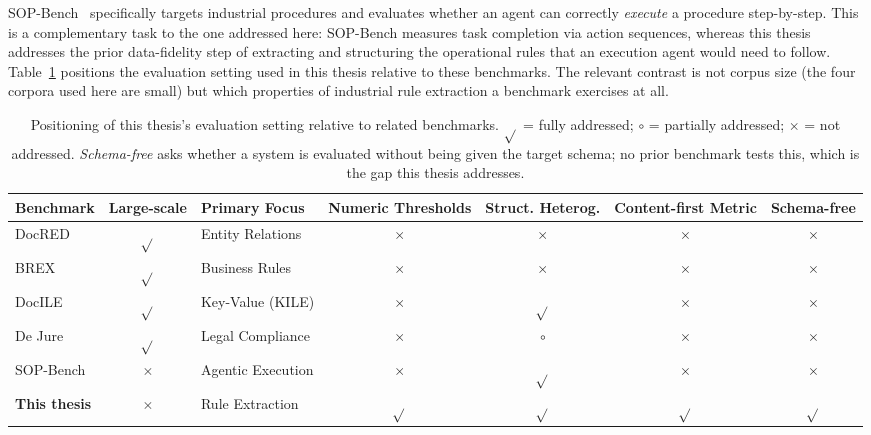 \documentclass[11pt]{article}
\begin{document}
SOP-Bench~\cite{nandi2025sopbench} specifically targets industrial procedures and
evaluates whether an agent can correctly \emph{execute} a procedure step-by-step.
This is a complementary task to the one addressed here: SOP-Bench measures task
completion via action sequences, whereas this thesis addresses the prior data-fidelity step of extracting and
structuring the operational rules that an execution agent would need to follow.
Table~\ref{tab:benchmark_landscape} positions the evaluation setting used in this
thesis relative to these benchmarks. The relevant contrast is not corpus size (the four corpora used here are small) but which properties of industrial rule
extraction a benchmark exercises at all.

\begin{table}[ht]
\centering
\caption{Positioning of this thesis's evaluation setting relative to related
benchmarks. $\sqrt{}$ = fully addressed; $\circ$ = partially addressed;
$\times$ = not addressed. \emph{Schema-free} asks whether a system is evaluated
without being given the target schema; no prior benchmark tests this, which is
the gap this thesis addresses.}
\label{tab:benchmark_landscape}
\begin{tabular}{l|c|p{1.5cm}|c|c|c|c}
\hline
\textbf{Benchmark} & \textbf{Large-scale} & \textbf{Primary Focus} & \textbf{Numeric Thresholds} & \textbf{Struct. Heterog.} & \textbf{Content-first Metric} & \textbf{Schema-free} \\
\hline
DocRED~\cite{yao2019docred} & $\sqrt{}$ & Entity Relations & $\times$ & $\times$ & $\times$ & $\times$ \\
BREX~\cite{yang2025brex} & $\sqrt{}$ & Business Rules & $\times$ & $\times$ & $\times$ & $\times$ \\
DocILE~\cite{simsa2023docile} & $\sqrt{}$ & Key-Value (KILE) & $\times$ & $\sqrt{}$ & $\times$ & $\times$ \\
De Jure~\cite{guliani2026dejure} & $\sqrt{}$ & Legal Compliance & $\times$ & $\circ$ & $\times$ & $\times$ \\
SOP-Bench~\cite{nandi2025sopbench} & $\times$ & Agentic Execution & $\times$ & $\sqrt{}$ & $\times$ & $\times$ \\
\textbf{This thesis} & $\times$ & Rule Extraction & $\sqrt{}$ & $\sqrt{}$ & $\sqrt{}$ & $\sqrt{}$ \\
\hline
\end{tabular}
\end{table}

\end{document}
